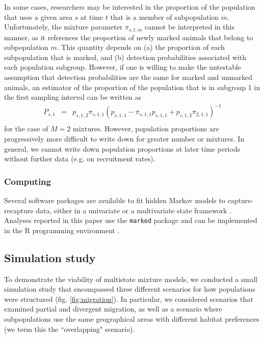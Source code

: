 \documentclass[times,mee,doublespace,]{besauth2}
\begin{document}
In some cases, researchers may be interested in the proportion of the population that uses a given area $s$ at time $t$ that is a member of subpopulation $m$. Unfortunately, the mixture parameter $\pi_{s,t,m}$ cannot be interpreted in this manner, as it references the proportion of newly marked animals that belong to subpopulation $m$.  This quantity depends on (a) the proportion of each subpopulation that is marked, and (b) detection probabilities associated with each population subgroup.  However, if one is willing to make the untestable assumption that detection probabilities are the same for marked and unmarked animals, an estimator of the proportion of the population that is in subgroup 1 in the first sampling interval can be written as
\begin{eqnarray*}
   P_{s,1} & = & p_{s,1,2} \pi_{s,1,1} (p_{s,1,1}-\pi_{s,1,1}p_{s,1,1}+p_{s,1,2}\pi_{2,1,1})^{-1} \\
\end{eqnarray*}
for the case of $M=2$ mixtures.  However, population proportions are progressively more difficult to write down for greater number or mixtures.  In general, we cannot write down population proportions at later time periods without further data (e.g. on recruitment rates).


\subsubsection{Computing}

Several software packages are available to fit hidden Markov models to capture-recapture data, either in a univariate \citep[e.g. \texttt{E-SURGE};][]{ChoquetEtAl2009b} or a multivariate state framework \citep[\texttt{marked};][]{LaakeEtAl2013,JohnsonEtAl2016}.  Analyses reported in this paper use the \texttt{marked} package and can be implemented in the R programming environment \citep{RTeam2015}.

\subsection{Simulation study}

To demonstrate the viability of multistate mixture models, we conducted a small simulation study that encompassed three different scenarios for how populations were structured (fig. \ref{fig:migration}).  In particular, we considered scenarios that examined partial and divergent migration, as well as a scenario where subpopulations use the same geographical areas with different habitat preferences (we term this the ``overlapping" scenario). 
\end{document}
